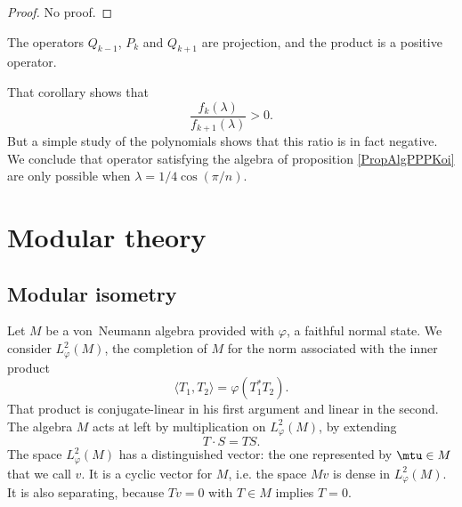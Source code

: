 \begin{proof}
No proof.
\end{proof}

\begin{corollary}
The operators $Q_{k-1}$, $P_k$ and $Q_{k+1}$ are projection, and the product is a positive operator.
\end{corollary}

That corollary shows that
\begin{equation}
	\frac{ f_k(\lambda) }{ f_{k+1}(\lambda) }>0.
\end{equation}
But a simple study of the polynomials shows that this ratio is in fact negative. We conclude that operator satisfying the algebra of proposition \eqref{PropAlgPPPKoi} are only possible when $\lambda=1/4\cos(\pi/n)$.





					\section{Modular theory}

					\subsection{Modular isometry}

Let $M$ be a von~Neumann algebra provided with $\varphi$, a faithful normal state. We consider $L_{\varphi}^2(M)$, the completion of $M$ for the norm associated with the inner product
\begin{equation}
	\langle T_1, T_2\rangle =\varphi(T^*_1T_2).
\end{equation}
That product is conjugate-linear in his first argument and linear in the second. The algebra $M$ acts at left by multiplication on $L_{\varphi}^2(M)$, by extending
\begin{equation}
	T\cdot S = TS.
\end{equation}
The space $L_{\varphi}^2(M)$ has a distinguished vector: the one represented by $\mtu\in M$ that we call $v$. It is a cyclic vector for $M$, i.e. the space $Mv$ is dense in $ L_{\varphi}^2(M)$. It is also separating, because $Tv=0$ with $T\in M$ implies $T=0$.

